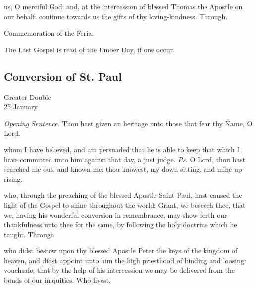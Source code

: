 \postcommunion
{} us, O merciful God: and, at the intercession of blessed Thomas the Apostle on our behalf, continue towards us the gifts of thy loving-kindness. Through.
\begin{rubric}
    Commemoration of the Feria.%
\end{rubric}
\begin{rubric}
    The Last Gospel is read of the Ember Day, if one occur.%
\end{rubric}


\clearpage
\subsection{Conversion of St. Paul}
\begin{inhead}
    {Greater Double\\
25 January}
\end{inhead}
\par\noindent
\textit{Opening Sentence.} Thou hast given an heritage unto those that fear thy Name, O Lord.

\introit
{} whom I have believed, and am persuaded that he is able to keep that which I have committed unto him against that day, a just judge. \textit{Ps.} O Lord, thou hast searched me out, and known me: thou knowest, my down-sitting, and mine up-rising.

\collect
{} who, through the preaching of the blessed Apostle Saint Paul, hast caused the light of the Gospel to shine throughout the world; Grant, we beseech thee, that we, having his wonderful conversion in remembrance, may show forth our thankfulness unto thee for the same, by following the holy doctrine which he taught. Through.

 who didst bestow upon thy blessed Apostle Peter the keys of the kingdom of heaven, and didst appoint unto him the high priesthood of binding and loosing: vouchsafe; that by the help of his intercession we may be delivered from the bonds of our iniquities. Who livest.

